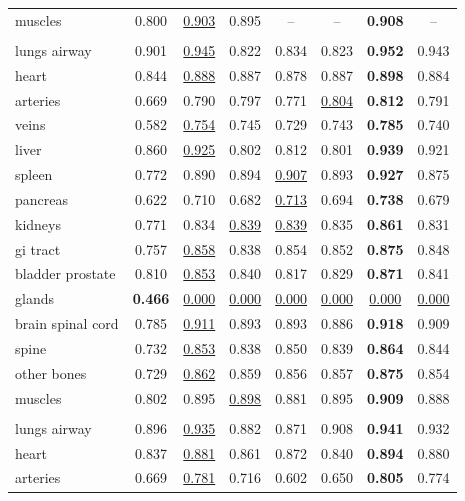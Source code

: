 \begin{minipage}{\textwidth}
{\begin{tabular}{@{}lccccccc@{}}
muscles & 0.800 & \underline{0.903} & 0.895 & -- & -- & \textbf{0.908} & -- \\
\addlinespace
\multicolumn{8}{@{}l}{\textit{joint}} \\
lungs airway & 0.901 & \underline{0.945} & 0.822 & 0.834 & 0.823 & \textbf{0.952} & 0.943 \\
heart & 0.844 & \underline{0.888} & 0.887 & 0.878 & 0.887 & \textbf{0.898} & 0.884 \\
arteries & 0.669 & 0.790 & 0.797 & 0.771 & \underline{0.804} & \textbf{0.812} & 0.791 \\
veins & 0.582 & \underline{0.754} & 0.745 & 0.729 & 0.743 & \textbf{0.785} & 0.740 \\
liver & 0.860 & \underline{0.925} & 0.802 & 0.812 & 0.801 & \textbf{0.939} & 0.921 \\
spleen & 0.772 & 0.890 & 0.894 & \underline{0.907} & 0.893 & \textbf{0.927} & 0.875 \\
pancreas & 0.622 & 0.710 & 0.682 & \underline{0.713} & 0.694 & \textbf{0.738} & 0.679 \\
kidneys & 0.771 & 0.834 & \underline{0.839} & \underline{0.839} & 0.835 & \textbf{0.861} & 0.831 \\
gi tract & 0.757 & \underline{0.858} & 0.838 & 0.854 & 0.852 & \textbf{0.875} & 0.848 \\
bladder prostate & 0.810 & \underline{0.853} & 0.840 & 0.817 & 0.829 & \textbf{0.871} & 0.841 \\
glands & \textbf{0.466} & \underline{0.000} & \underline{0.000} & \underline{0.000} & \underline{0.000} & \underline{0.000} & \underline{0.000} \\
brain spinal cord & 0.785 & \underline{0.911} & 0.893 & 0.893 & 0.886 & \textbf{0.918} & 0.909 \\
spine & 0.732 & \underline{0.853} & 0.838 & 0.850 & 0.839 & \textbf{0.864} & 0.844 \\
other bones & 0.729 & \underline{0.862} & 0.859 & 0.856 & 0.857 & \textbf{0.875} & 0.854 \\
muscles & 0.802 & 0.895 & \underline{0.898} & 0.881 & 0.895 & \textbf{0.909} & 0.888 \\
\addlinespace
\multicolumn{8}{@{}l}{\textit{joint (8000 steps)}} \\
lungs airway & 0.896 & \underline{0.935} & 0.882 & 0.871 & 0.908 & \textbf{0.941} & 0.932 \\
heart & 0.837 & \underline{0.881} & 0.861 & 0.872 & 0.840 & \textbf{0.894} & 0.880 \\
arteries & 0.669 & \underline{0.781} & 0.716 & 0.602 & 0.650 & \textbf{0.805} & 0.774 \\

\end{tabular}}
\end{minipage}
